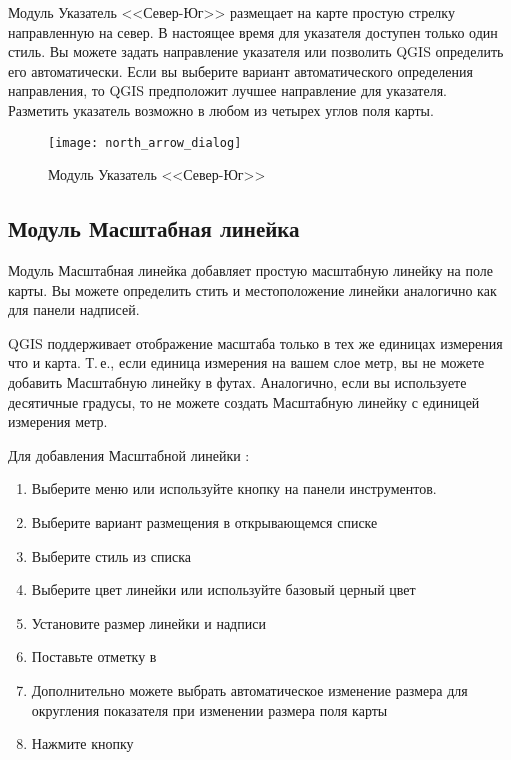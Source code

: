 Модуль Указатель <<Север-Юг>> размещает на карте простую стрелку направленную
на север. В настоящее время для указателя доступен только один стиль. Вы
можете задать направление указателя или позволить QGIS определить его
автоматически. Если вы выберите вариант автоматического определения
направления, то QGIS предположит лучшее направление для указателя. Разметить
указатель возможно в любом из четырех углов поля карты.

\begin{figure}[ht]
   \centering
   \texttt{[image: north\_arrow\_dialog]}
   \caption{Модуль Указатель <<Север-Юг>> \wincaption}\label{fig:north_arrow}
\end{figure}

\subsection{Модуль Масштабная линейка}
Модуль Масштабная линейка добавляет простую масштабную линейку на поле
карты. Вы можете определить стить и местоположение линейки аналогично
как для панели надписей.

QGIS поддерживает отображение масштаба только в тех же единицах измерения
что и карта. Т.\,е., если единица измерения на вашем слое метр, вы не
можете добавить Масштабную линейку в футах. Аналогично, если вы используете
десятичные градусы, то не можете создать Масштабную линейку с единицей
измерения метр.

Для добавления Масштабной линейки :

\begin{enumerate}
\item Выберите меню  \arrow {}
\arrow {} или используйте
кнопку  на панели инструментов.
\item Выберите вариант размещения в открывающемся списке
\item Выберите стиль из списка 
\item Выберите цвет линейки  или используйте
базовый церный цвет
\item Установите размер линейки и надписи 
\item Поставьте отметку в 
\item Дополнительно можете выбрать автоматическое изменение размера для
округления показателя при изменении  размера поля карты \\
\item Нажмите кнопку 
\end{enumerate}

